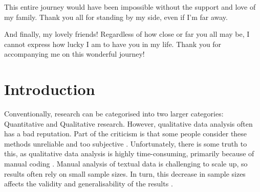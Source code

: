 \documentclass{l4proj}
\begin{document}
This entire journey would have been impossible without the support and love of my family. Thank you all for standing by my side, even if I'm far away. 

And finally, my lovely friends! Regardless of how close or far you all may be, I cannot express how lucky I am to have you in my life. Thank you for accompanying me on this wonderful journey!

\tableofcontents

%
%
%
%
%
%
%
%
\chapter{Introduction}

Conventionally, research can be categorised into two larger categories: Quantitative and Qualitative research. However, qualitative data analysis often has a bad reputation. Part of the criticism is that some people consider these methods unreliable and too subjective \citep{janasik2009text, leopold2020opposites}. Unfortunately, there is some truth to this, as qualitative data analysis is highly time-consuming, primarily because of manual coding \citep{parks2022natural}. Manual analysis of textual data is challenging to scale up, so results often rely on small sample sizes. In turn, this decrease in sample sizes affects the validity and generalisability of the results \citep{crowston2012using}.
\end{document}
